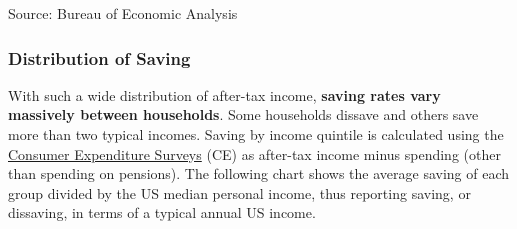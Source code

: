 \documentclass{report}
\makeatletter
\newcommand{\tbllink}[1]{\href{https://raw.githubusercontent.com/bdecon/US-chartbook/master/chartbook/data/#1}{\faTable}}
\newcommand*\short[1]{\expandafter\@gobbletwo\number\numexpr#1\relax}
\newcommand{\dateaxisticks}{
		date coordinates in=x, axis line style={draw=none},
		xmax={2024-01-31},
		max space between ticks=40,	    
		xtick={{1990-01-01}, {1992-01-01}, {1994-01-01}, 
			{1996-01-01}, {1998-01-01}, {2000-01-01}, 
			{2002-01-01}, {2004-01-01}, {2006-01-01},
			{2008-01-01}, {2010-01-01}, {2012-01-01}, {2014-01-01},
		    {2016-01-01}, {2018-01-01}, {2020-01-01}, {2022-01-01}, 
		    {2024-01-01}, {2026-01-01}},
		minor xtick={{1989-01-01}, {1991-01-01}, {1993-01-01},
			{1995-01-01}, {1997-01-01}, {1999-01-01}, 
			{2001-01-01}, {2003-01-01}, {2005-01-01}, {2007-01-01},
		    {2009-01-01}, {2011-01-01}, {2013-01-01}, {2015-01-01},
		    {2017-01-01}, {2019-01-01}, {2021-01-01}, {2023-01-01}, 
		    {2025-01-01}, {2027-01-01}},
		enlarge y limits={0.06}, enlarge x limits={0.01},
		xticklabel style={align=center, yshift=-2pt}, tick label style={inner sep=0pt},
		}
\newcommand{\bbar}[2]{extra #1 ticks = {{#2}}, extra #1 tick labels = ,
		extra #1 tick style = {grid=major, grid style={thick, black!25}},}
\newcommand{\stdline}[4]{\addplot[very thick, no markers, color=#1] 
		table [x=#2, y=#3, col sep=comma] {#4};	}
\newcommand{\rbars}{
		\fill[color=black!10] (axis cs:{1990-07-01},\pgfkeysvalueof{/pgfplots/ymin})
			rectangle (axis cs:{1991-03-01}, \pgfkeysvalueof{/pgfplots/ymax});
		\fill[color=black!10] (axis cs:{2007-12-01},\pgfkeysvalueof{/pgfplots/ymin})
			rectangle (axis cs:{2009-07-01}, \pgfkeysvalueof{/pgfplots/ymax});
		\fill[color=black!10] (axis cs:{2001-03-01},\pgfkeysvalueof{/pgfplots/ymin})
			rectangle (axis cs:{2001-11-01}, \pgfkeysvalueof{/pgfplots/ymax});
		\fill[color=black!10] (axis cs:{2020-02-01},\pgfkeysvalueof{/pgfplots/ymin})
			rectangle (axis cs:{2020-05-01}, \pgfkeysvalueof{/pgfplots/ymax});}
\makeatother
\begin{document}
{\begin{minipage}{1.0\textwidth}
\hspace{2mm} 

\footnotesize{Source: Bureau of Economic Analysis} \hfill \tbllink{psavert.csv}
\vspace{1mm}

\subsubsection*{Distribution of Saving}
\small With such a wide distribution of after-tax income, \textbf{saving rates vary massively between households}. Some households dissave and others save more than two typical incomes. Saving by income quintile is calculated using the \href{https://www.bls.gov/cex/}{Consumer Expenditure Surveys} (CE) as after-tax income minus spending (other than spending on pensions). The following chart shows the average saving of each group divided by the US median personal income, thus reporting saving, or dissaving, in terms of a typical annual US income. 
\vspace{1mm}


\end{minipage}}
\end{document}
